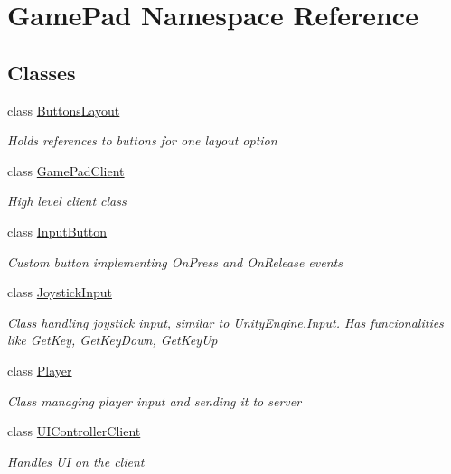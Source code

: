 \hypertarget{namespace_game_pad}{}\section{Game\+Pad Namespace Reference}
\label{namespace_game_pad}
\subsection*{Classes}
\begin{DoxyCompactItemize}
\item 
class \mbox{\hyperlink{class_game_pad_1_1_buttons_layout}{Buttons\+Layout}}
\begin{DoxyCompactList}\small\item\em Holds references to buttons for one layout option \end{DoxyCompactList}\item 
class \mbox{\hyperlink{class_game_pad_1_1_game_pad_client}{Game\+Pad\+Client}}
\begin{DoxyCompactList}\small\item\em High level client class \end{DoxyCompactList}\item 
class \mbox{\hyperlink{class_game_pad_1_1_input_button}{Input\+Button}}
\begin{DoxyCompactList}\small\item\em Custom button implementing On\+Press and On\+Release events \end{DoxyCompactList}\item 
class \mbox{\hyperlink{class_game_pad_1_1_joystick_input}{Joystick\+Input}}
\begin{DoxyCompactList}\small\item\em Class handling joystick input, similar to Unity\+Engine.\+Input. Has funcionalities like Get\+Key, Get\+Key\+Down, Get\+Key\+Up \end{DoxyCompactList}\item 
class \mbox{\hyperlink{class_game_pad_1_1_player}{Player}}
\begin{DoxyCompactList}\small\item\em Class managing player input and sending it to server \end{DoxyCompactList}\item 
class \mbox{\hyperlink{class_game_pad_1_1_u_i_controller_client}{U\+I\+Controller\+Client}}
\begin{DoxyCompactList}\small\item\em Handles UI on the client \end{DoxyCompactList}\end{DoxyCompactItemize}
